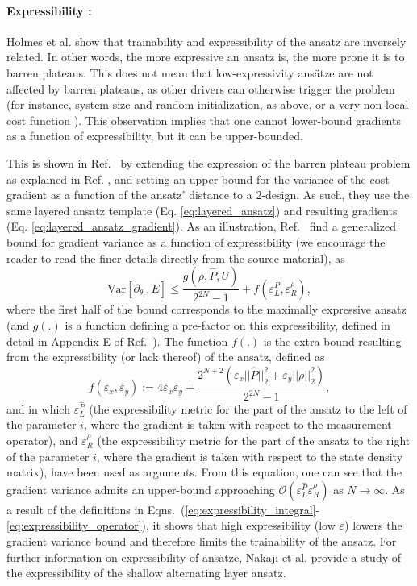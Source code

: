 \paragraph{Expressibility \cite{Holmes2021}:} Holmes et al. show that trainability and expressibility of the ansatz are inversely related. In other words, the more expressive an ansatz is, the more prone it is to barren plateaus. This does not mean that low-expressivity ans\"atze are not affected by barren plateaus, as other drivers can otherwise trigger the problem (for instance, system size and random initialization, as above, or a very non-local cost function \cite{Cerezo2021_BP, Uvarov2020, Sharma2020}). This observation implies that one cannot lower-bound gradients as a function of expressibility, but it can be upper-bounded.

This is shown in Ref.~\cite{Holmes2021} by extending the expression of the barren plateau problem as explained in Ref. \cite{McClean2018}, and setting an upper bound for the variance of the cost gradient as a function of the ansatz' distance to a 2-design. As such, they use the same layered ansatz template (Eq. \ref{eq:layered_ansatz}) and resulting gradients (Eq. \ref{eq:layered_ansatz_gradient}). As an illustration, Ref.~\cite{Holmes2021} find a generalized bound for gradient variance as a function of expressibility (we encourage the reader to read the finer details directly from the source material), as
\begin{equation}
    \mathrm{Var}[\partial_{\theta_i}, E] \leqslant \frac{g (\rho, \hat{P}, U)}{2^{2N}- 1} + f(\varepsilon^{\hat{P}}_L, \varepsilon^{\rho}_R),
\end{equation}
where the first half of the bound corresponds to the maximally expressive ansatz (and $g(.)$ is a function defining a pre-factor on this expressibility, defined in detail in Appendix E of Ref.~\cite{Holmes2021}). The function $f(.)$ is the extra bound resulting from the expressibility (or lack thereof) of the ansatz, defined as
\begin{equation}
    f(\varepsilon_x, \varepsilon_y) := 4\varepsilon_x \varepsilon_y + \frac{2^{N + 2} ( \varepsilon_x ||\hat{P}||^2_2 + \varepsilon_y||\rho||^2_2) }{2^{2N} - 1},
\end{equation}
and in which $\varepsilon^{\hat{P}}_L$ (the expressibility metric for the part of the ansatz to the left of the parameter $i$, where the gradient is taken with respect to the measurement operator), and  $\varepsilon^{\rho}_R$ (the expressibility metric for the part of the ansatz to the right of the parameter $i$, where the gradient is taken with respect to the state density matrix), have been used as arguments. From this equation, one can see that the gradient variance admits an upper-bound approaching $\mathcal{O}(\varepsilon^{\hat{P}}_L \varepsilon^{\rho}_R)$ as $N \rightarrow \infty$. As a result of the definitions in Eqns.~(\ref{eq:expressibility_integral}-\ref{eq:expressibility_operator}), it shows that high expressibility (low $\varepsilon$) lowers the gradient variance bound and therefore limits the trainability of the ansatz. For further information on expressibility of ans\"atze, Nakaji et al. \cite{Nakaji2021} provide a study of the expressibility of the shallow alternating layer ansatz. 

